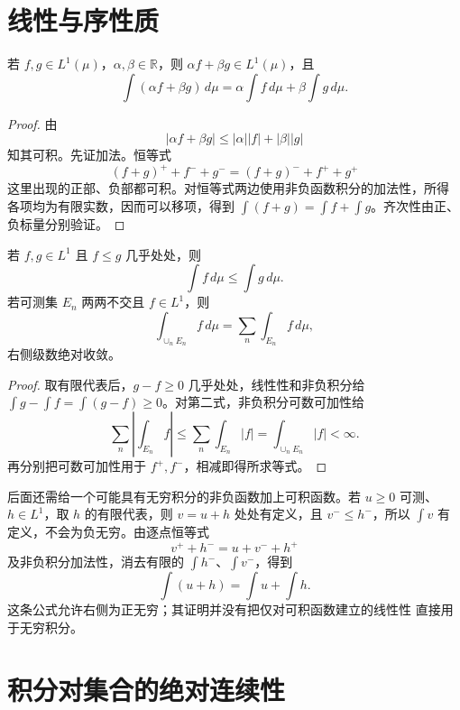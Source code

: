 \section{线性与序性质}

\begin{theorem}[积分的线性]
\label{thm:lebesgue-integral-linearity}
若 \(f,g\in L^1(\mu)\)，\(\alpha,\beta\in\mathbb R\)，则
\(\alpha f+\beta g\in L^1(\mu)\)，且
\[
 \int(\alpha f+\beta g)\,d\mu
 =\alpha\int f\,d\mu+\beta\int g\,d\mu .
\]
\end{theorem}

\begin{proof}
由
\[
 |\alpha f+\beta g|\le|\alpha||f|+|\beta||g|
\]
知其可积。先证加法。恒等式
\[
 (f+g)^++f^-+g^-=(f+g)^-+f^++g^+
\]
这里出现的正部、负部都可积。对恒等式两边使用非负函数积分的加法性，所得
各项均为有限实数，因而可以移项，得到
\(\int(f+g)=\int f+\int g\)。齐次性由正、负标量分别验证。
\end{proof}

\begin{corollary}
若 \(f,g\in L^1\) 且 \(f\le g\) 几乎处处，则
\[
 \int f\,d\mu\le\int g\,d\mu.
\]
若可测集 \(E_n\) 两两不交且 \(f\in L^1\)，则
\[
 \int_{\cup_nE_n}f\,d\mu=\sum_n\int_{E_n}f\,d\mu,
\]
右侧级数绝对收敛。
\end{corollary}

\begin{proof}
取有限代表后，\(g-f\ge0\) 几乎处处，线性性和非负积分给
\(\int g-\int f=\int(g-f)\ge0\)。对第二式，非负积分可数可加性给
\[
 \sum_n\left|\int_{E_n}f\right|
 \le\sum_n\int_{E_n}|f|=\int_{\cup_nE_n}|f|<\infty.
\]
再分别把可数可加性用于 \(f^+,f^-\)，相减即得所求等式。
\end{proof}

后面还需给一个可能具有无穷积分的非负函数加上可积函数。若 \(u\ge0\) 可测、
\(h\in L^1\)，取 \(h\) 的有限代表，则 \(v=u+h\) 处处有定义，且
\(v^-\le h^-\)，所以 \(\int v\) 有定义，不会为负无穷。由逐点恒等式
\[
 v^++h^-=u+v^-+h^+
\]
及非负积分加法性，消去有限的 \(\int h^-\)、\(\int v^-\)，得到
\begin{equation}\label{eq:nonnegative-integrable-translation}
 \int(u+h)=\int u+\int h.
\end{equation}
这条公式允许右侧为正无穷；其证明并没有把仅对可积函数建立的线性性
直接用于无穷积分。

\section{积分对集合的绝对连续性}


